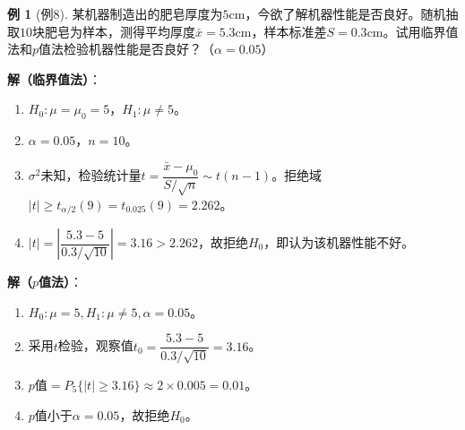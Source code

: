 \documentclass[11pt,a4paper]{report}
\theoremstyle{definition}
\newtheorem{example}{例}[chapter]
\theoremstyle{plain}
\begin{document}
\begin{example}[例8]
某机器制造出的肥皂厚度为$5$cm，今欲了解机器性能是否良好。随机抽取$10$块肥皂为样本，测得平均厚度$\bar{x}=5.3$cm，样本标准差$S=0.3$cm。试用临界值法和$p$值法检验机器性能是否良好？（$\alpha=0.05$）

\textbf{解（临界值法）}：
\begin{enumerate}[label=步骤\arabic*.,leftmargin=2em]
    \item $H_0:\mu=\mu_0=5$，$H_1:\mu\neq 5$。
    \item $\alpha=0.05$，$n=10$。
    \item $\sigma^2$未知，检验统计量$t=\dfrac{\bar{x}-\mu_0}{S/\sqrt{n}}\sim t(n-1)$。拒绝域$|t|\geq t_{\alpha/2}(9)=t_{0.025}(9)=2.262$。
    \item $|t|=\left|\dfrac{5.3-5}{0.3/\sqrt{10}}\right|=3.16>2.262$，故拒绝$H_0$，即认为该机器性能不好。
\end{enumerate}

\textbf{解（$p$值法）}：
\begin{enumerate}[label=步骤\arabic*.,leftmargin=2em]
    \item $H_0:\mu=5,H_1:\mu\neq 5,\alpha=0.05$。
    \item 采用$t$检验，观察值$t_0=\dfrac{5.3-5}{0.3/\sqrt{10}}=3.16$。
    \item $p$值$=P_5\{|t|\geq 3.16\}\approx 2\times 0.005=0.01$。
    \item $p$值小于$\alpha=0.05$，故拒绝$H_0$。
\end{enumerate}
\end{example}
\end{document}
